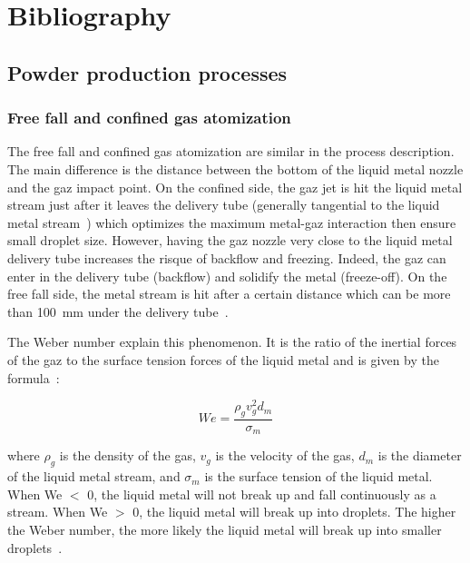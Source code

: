 \chapter{Bibliography}

\section{Powder production processes}

\subsection{Free fall and confined gas atomization}

The free fall and confined gas atomization are similar in the process description. The main difference is the distance between the bottom of the liquid metal nozzle and the gaz impact point. On the confined side, the gaz jet is hit the liquid metal stream just after it leaves the delivery tube (generally tangential to the liquid metal stream~\cite{Singh2001Studyfree}) which optimizes the maximum metal-gaz interaction then ensure small droplet size. However, having the gaz nozzle very close to the liquid metal delivery tube increases the risque of backflow and freezing. Indeed, the gaz can enter in the delivery tube (backflow) and solidify the metal (freeze-off). On the free fall side, the metal stream is hit after a certain distance which can be more than 100~mm under the delivery tube~\cite{Kassym2020Atomizationprocesses}.


The Weber number explain this phenomenon. It is the ratio of the inertial forces of the gaz to the surface tension forces of the liquid metal and is given by the formula~\cite{Chang2022Numericalsimulation}:

\begin{equation}
    \boxed{We = \frac{\rho_g v_g^2 d_m}{\sigma_m}}
\end{equation}

where $\rho_g$ is the density of the gas, $v_g$ is the velocity of the gas, $d_m$ is the diameter of the liquid metal stream, and $\sigma_m$ is the surface tension of the liquid metal. When We $<$ 0, the liquid metal will not break up and fall continuously as a stream. When We $>$ 0, the liquid metal will break up into droplets. The higher the Weber number, the more likely the liquid metal will break up into smaller droplets~\cite{Du2024NumericalSimulation}.\\

